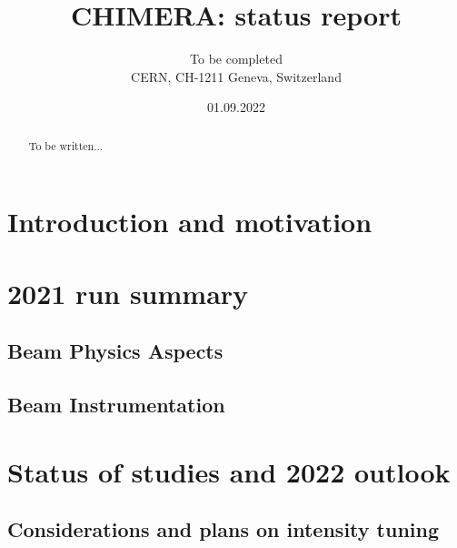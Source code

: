 \documentclass{cernatsnote}
\title{CHIMERA: status report}
\author{
    	To be completed \; \\		
    	CERN, CH-1211 Geneva, Switzerland
    }
\date{01.09.2022}
\begin{document}
    \maketitle
    
    \begin{abstract}
        To be written...
    \end{abstract}

    \begingroup
    \color{black}
    \pagebreak
    \tableofcontents
    \endgroup

\pagebreak

\section{Introduction and motivation}
    
    \pagebreak


\section{2021 run summary}
    
    \subsection{Beam Physics Aspects}
        
    \pagebreak
        
    \subsection{Beam Instrumentation}
        
        
        
        
        
    \pagebreak
        
\section{Status of studies and 2022 outlook}

    \subsection{Considerations and plans on intensity tuning}
        
    
\end{document}
